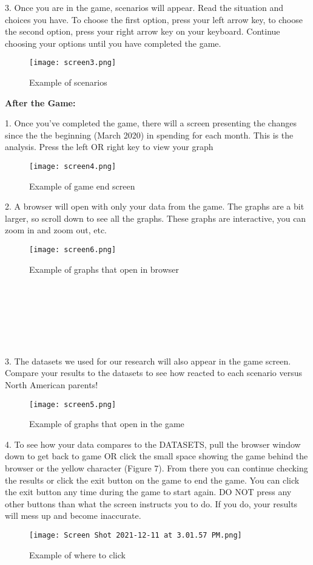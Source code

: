 \documentclass[fontsize=11pt]{article}
\begin{document}
    3. Once you are in the game, scenarios will appear. Read the situation and choices you have. To choose the first option, press your left arrow key, to choose the second option, press your right arrow key on your keyboard. Continue choosing your options until you have completed the game.
    \begin{figure}[htp]
        \centering
        \texttt{[image: screen3.png]}
        \caption{Example of scenarios}
        \label{fig:galaxy}
    \end{figure}

    \textbf{After the Game:}

    1. Once you’ve completed the game, there will a screen presenting the changes since the the beginning (March 2020) in spending for each month. This is the analysis. Press the left OR right key to view your graph
    \begin{figure}[htp]
        \centering
        \texttt{[image: screen4.png]}
        \caption{Example of game end screen}
        \label{fig:galaxy}
    \end{figure}


    2. A browser will open with only your data from the game. The graphs are a bit larger, so scroll down to see all the graphs. These graphs are interactive, you can zoom in and zoom out, etc.
    \begin{figure}[htp]
        \centering
        \texttt{[image: screen6.png]}
        \caption{Example of graphs that open in browser}
        \label{fig:galaxy}
    \end{figure}
    \\ \\ \\ \\ \\ \\

    3. The datasets we used for our research will also appear in the game screen. Compare your results to the datasets to see how reacted to each scenario versus North American parents!
    \begin{figure}[htp]
        \centering
        \texttt{[image: screen5.png]}
        \caption{Example of graphs that open in the game}
        \label{fig:galaxy}
    \end{figure}

    4. To see how your data compares to the DATASETS, pull the browser window down to get back to game OR click the small space showing the game behind the browser or the yellow character (Figure 7). From there you can continue checking the results or click the exit button on the game to end the game. You can click the exit button any time during the game to start again. DO NOT press any other buttons than what the screen instructs you to do. If you do, your results will mess up and become inaccurate.
    \begin{figure}[htp]
        \centering
        \texttt{[image: Screen Shot 2021-12-11 at 3.01.57 PM.png]}
        \caption{Example of where to click}
        \label{fig:galaxy}
    \end{figure}
\end{document}
